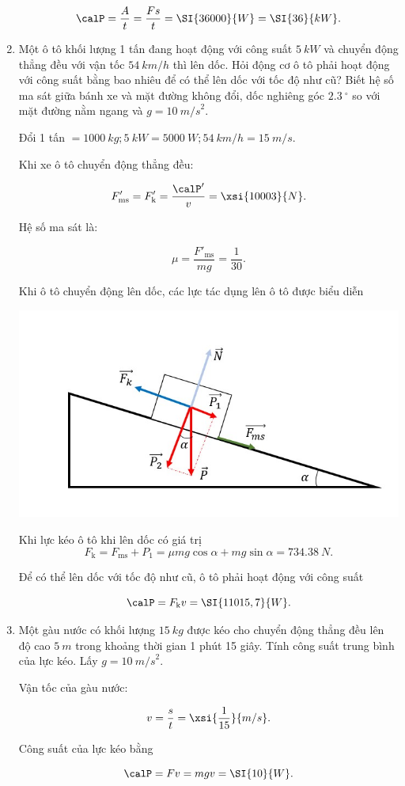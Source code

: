 \begin{enumerate}[label=\bfseries Câu \arabic*:]
{		$$\calP = \dfrac{A}{t} = \dfrac{Fs}{t} = \SI{36000}{W}  = \SI{36}{kW}.$$
	}
		\item {}
	
	
	{
		Một ô tô khối lượng 1 tấn đang hoạt động với công suất $\SI{5}{kW}$ và chuyển động thẳng đều với vận tốc $\SI{54}{km/h}$ thì lên dốc. Hỏi động cơ ô tô phải hoạt động với công suất bằng bao nhiêu để có thể lên dốc với tốc độ như cũ? Biết hệ số ma sát giữa bánh xe và mặt đường không đổi, dốc nghiêng góc $\SI{2,3}{^\circ}$ so với mặt đường nằm ngang và $g = \SI{10}{m/s}^2.$
	}
	
	\hideall
	{	
		Đổi 1 tấn $= \SI{1000}{kg}; \SI{5}{kW} = \SI{5000}{W}; \SI{54}{km/h} = \SI{15}{m/s}.$
		
		Khi xe ô tô chuyển động thẳng đều: 
		
		$$F'_\text{ms} = F'_\text{k} = \dfrac{\calP'}{v} = \xsi{{1000}{3}}{N}.$$
		
		Hệ số ma sát là:
		
		$$\mu = \dfrac{F'_\text{ms}}{mg} = \dfrac{1}{30}.$$
		
		Khi ô tô chuyển động lên dốc, các lực tác dụng lên ô tô được biểu diễn 
		
		
		\begin{center}
			\includegraphics[scale=0.8]{../figs/VN10-2022-PH-TP027-1.jpg}
		\end{center}
	
		Khi lực kéo ô tô khi lên dốc có giá trị
		$$F_\text{k} = F_\text{ms} + P_1 = \mu mg \cos \alpha + mg\sin \alpha = \SI{734,38}{N}.$$
		
		Để có thể lên dốc với tốc độ như cũ, ô tô phải hoạt động với công suất
		
		$$\calP = F_\text{k} v = \SI{11015,7}{W}.$$
	}
	\item {}
	
	
	{
		Một gàu nước có khối lượng $\SI{15}{kg}$ được kéo cho chuyển động thẳng đều lên độ cao $\SI{5}{m}$ trong khoảng thời gian 1 phút 15 giây. Tính công suất trung bình của lực kéo. Lấy $g = \SI{10}{m/s}^2$.
	}
	
	\hideall
	{	
		Vận tốc của gàu nước:
		
		$$v = \dfrac{s}{t} = \xsi{\dfrac{1}{15}}{m/s}.$$
		
		Công suất của lực kéo bằng
		
		$$\calP = Fv = mgv= \SI{10}{W}.$$
	}

\end{enumerate}